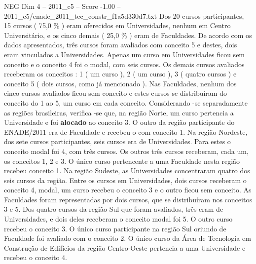 \begin{textsample}{NEG Dim 4 – 2011\_c5 – Score -1.00 – 2011\_c5/enade\_2011\_tec\_constr\_f1a5d330d7.txt}
Dos 20 cursos participantes, 15 cursos ( 75,0 \% ) eram oferecidos em Universidades, nenhum em Centro Universitário, e os cinco demais ( 25,0 \% ) eram de Faculdades.
De acordo com os dados apresentados, três cursos foram avaliados com conceito 5 e destes, dois eram vinculados a Universidades.
Apenas um curso em Universidades ficou sem conceito e o conceito 4 foi o modal, com seis cursos.
Os demais cursos avaliados receberam os conceitos : 1 ( um curso ), 2 ( um curso ), 3 ( quatro cursos ) e conceito 5 ( dois cursos, como já mencionado ).
Nas Faculdades, nenhum dos cinco cursos avaliados ficou sem conceito e estes cursos se distribuíram do conceito do 1 ao 5, um curso em cada conceito.
Considerando -se separadamente as regiões brasileiras, verifica -se que, na região Norte, um curso pertencia a Universidade e foi \textbf{alocado} ao conceito 3.
O outro da região participante do ENADE/2011 era de Faculdade e recebeu o com conceito 1.
Na região Nordeste, dos sete cursos participantes, seis cursos era de Universidades.
Para estes o conceito modal foi 4, com três cursos.
Os outros três cursos receberam, cada um, os conceitos 1, 2 e 3.
O único curso pertencente a uma Faculdade nesta região recebeu conceito 1.
Na região Sudeste, as Universidades concentraram quatro dos seis cursos da região.
Entre os cursos em Universidades, dois cursos receberam o conceito 4, modal, um curso recebeu o conceito 3 e o outro ficou sem conceito.
As Faculdades foram representadas por dois cursos, que se distribuíram nos conceitos 3 e 5.
Dos quatro cursos da região Sul que foram avaliados, três eram de Universidades, e dois deles receberam o conceito modal foi 5.
O outro curso recebeu o conceito 3.
O único curso participante na região Sul oriundo de Faculdade foi avaliado com o conceito 2.
O único curso da Área de Tecnologia em Construção de Edifícios da região Centro-Oeste pertencia a uma Universidade e recebeu o conceito 4.

\end{textsample}
